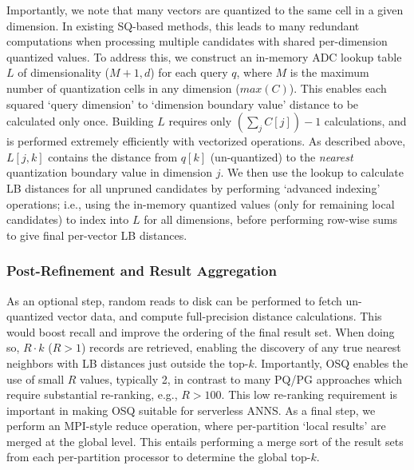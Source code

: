 Importantly, we note that many vectors are quantized to the same cell in a given dimension.
In existing SQ-based methods, this leads to many redundant computations when processing multiple candidates with shared per-dimension quantized values. 
To address this, we construct an in-memory ADC lookup table $L$ of dimensionality ($M + 1, d$) for each query $q$, where $M$ is the maximum number of quantization cells in any dimension ($max(C)$).
This enables each squared `query dimension' to `dimension boundary value' distance to be calculated only once.
Building $L$ requires only $(\sum_j C[j]) - 1$ calculations, and is performed extremely efficiently with vectorized operations. 
As described above, $L[j,k]$ contains the distance from $q[k]$ (un-quantized) to the \textit{nearest} quantization boundary value in dimension $j$. 
We then use the lookup to calculate LB distances for all unpruned candidates by performing `advanced indexing' \cite{NumpyAdvancedIndexing} operations; i.e., using the in-memory quantized values (only for remaining local candidates) to index into $L$ for all dimensions, before performing row-wise sums to give final per-vector LB distances.


\subsubsection{Post-Refinement and Result Aggregation}

As an optional step, random reads to disk can be performed to fetch un-quantized vector data, and compute full-precision distance calculations. This would boost recall and improve the ordering of the final result set. When doing so, $R \cdot k$ ($R > 1$) records are retrieved, enabling the discovery of any true nearest neighbors with LB distances just outside the top-$k$. 
Importantly, OSQ enables the use of small $R$ values, typically 2, in contrast to many PQ/PG approaches which require substantial re-ranking, e.g., $R > 100$. This low re-ranking requirement is important in making OSQ suitable for serverless ANNS.
As a final step, we perform an MPI-style reduce operation, where per-partition `local results' are merged at the global level. This entails performing a merge sort of the result sets from each per-partition processor to determine the global top-$k$.